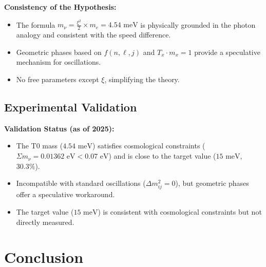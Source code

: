 \documentclass[12pt,a4paper]{article}
\newcommand{\xipar}{\xi}
\begin{document}
	\begin{important}
		\textbf{Consistency of the Hypothesis:}
		\begin{itemize}
			\item The formula \(m_\nu = \frac{\xipar^2}{2} \times m_e = 4.54 \text{ meV}\) is physically grounded in the photon analogy and consistent with the speed difference.
			\item Geometric phases based on \(f(n, \ell, j)\) and \(T_x \cdot m_x = 1\) provide a speculative mechanism for oscillations.
			\item No free parameters except \(\xipar\), simplifying the theory.
		\end{itemize}
	\end{important}
	
	\subsection{Experimental Validation}
	
	\begin{experimental}
		\textbf{Validation Status (as of 2025):}
		\begin{itemize}
			\item The T0 mass (\(4.54 \text{ meV}\)) satisfies cosmological constraints (\(\Sigma m_\nu = 0.01362 \text{ eV} < 0.07 \text{ eV}\)) and is close to the target value (\(15 \text{ meV}\), \(30.3\%\)).
			\item Incompatible with standard oscillations (\(\Delta m^2_{ij} = 0\)), but geometric phases offer a speculative workaround.
			\item The target value (\(15 \text{ meV}\)) is consistent with cosmological constraints but not directly measured.
		\end{itemize}
	\end{experimental}
	
	\section{Conclusion}
	
\end{document}

